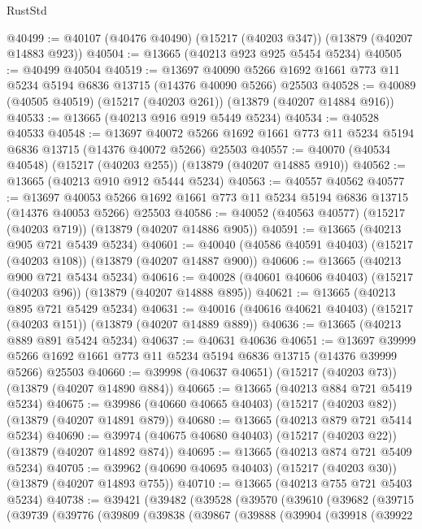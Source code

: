 \begin{lexlean}{RustStd}
\begin{coremodule}
@40499 := @40107 (@40476 @40490) (@15217 (@40203 @347)) (@13879 (@40207 @14883 @923))
@40504 := @13665 (@40213 @923 @925 @5454 @5234)
@40505 := @40499 @40504
@40519 := @13697
    @40090
    @5266
    @1692
    @1661
    @773
    @11
    @5234
    @5194
    @6836
    @13715
    (@14376 @40090 @5266)
    @25503
@40528 := @40089 (@40505 @40519) (@15217 (@40203 @261)) (@13879 (@40207 @14884 @916))
@40533 := @13665 (@40213 @916 @919 @5449 @5234)
@40534 := @40528 @40533
@40548 := @13697
    @40072
    @5266
    @1692
    @1661
    @773
    @11
    @5234
    @5194
    @6836
    @13715
    (@14376 @40072 @5266)
    @25503
@40557 := @40070 (@40534 @40548) (@15217 (@40203 @255)) (@13879 (@40207 @14885 @910))
@40562 := @13665 (@40213 @910 @912 @5444 @5234)
@40563 := @40557 @40562
@40577 := @13697
    @40053
    @5266
    @1692
    @1661
    @773
    @11
    @5234
    @5194
    @6836
    @13715
    (@14376 @40053 @5266)
    @25503
@40586 := @40052 (@40563 @40577) (@15217 (@40203 @719)) (@13879 (@40207 @14886 @905))
@40591 := @13665 (@40213 @905 @721 @5439 @5234)
@40601 := @40040 (@40586 @40591 @40403) (@15217 (@40203 @108)) (@13879 (@40207 @14887 @900))
@40606 := @13665 (@40213 @900 @721 @5434 @5234)
@40616 := @40028 (@40601 @40606 @40403) (@15217 (@40203 @96)) (@13879 (@40207 @14888 @895))
@40621 := @13665 (@40213 @895 @721 @5429 @5234)
@40631 := @40016 (@40616 @40621 @40403) (@15217 (@40203 @151)) (@13879 (@40207 @14889 @889))
@40636 := @13665 (@40213 @889 @891 @5424 @5234)
@40637 := @40631 @40636
@40651 := @13697
    @39999
    @5266
    @1692
    @1661
    @773
    @11
    @5234
    @5194
    @6836
    @13715
    (@14376 @39999 @5266)
    @25503
@40660 := @39998 (@40637 @40651) (@15217 (@40203 @73)) (@13879 (@40207 @14890 @884))
@40665 := @13665 (@40213 @884 @721 @5419 @5234)
@40675 := @39986 (@40660 @40665 @40403) (@15217 (@40203 @82)) (@13879 (@40207 @14891 @879))
@40680 := @13665 (@40213 @879 @721 @5414 @5234)
@40690 := @39974 (@40675 @40680 @40403) (@15217 (@40203 @22)) (@13879 (@40207 @14892 @874))
@40695 := @13665 (@40213 @874 @721 @5409 @5234)
@40705 := @39962 (@40690 @40695 @40403) (@15217 (@40203 @30)) (@13879 (@40207 @14893 @755))
@40710 := @13665 (@40213 @755 @721 @5403 @5234)
@40738 := @39421
    (@39482
      (@39528
        (@39570
          (@39610
            (@39682
              (@39715
                (@39739
                  (@39776
                    (@39809
                      (@39838
                        (@39867
                          (@39888
                            (@39904
                              (@39918
                                (@39922

\end{coremodule}
\end{lexlean}
